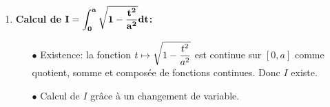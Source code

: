 \documentclass[a4paper, 11pt,reqno]{article}
\begin{document}
\begin{correction}
\begin{enumerate}
		\item \textbf{Calcul de $\mathbf{\displaystyle  I=\int_0^a \displaystyle\sqrt{1-\displaystyle\frac{t^2}{a^2}} dt}$:}
		      \begin{itemize}
			      \item[$\bullet$] Existence: la fonction $t\mapsto  \displaystyle\sqrt{1-\displaystyle\frac{t^2}{a^2}} $ est continue sur $\left\lbrack 0,a \right\rbrack$ comme quotient, somme et compos\'ee de fonctions continues. Donc $I$ existe.
			      \item[$\bullet$] Calcul de $I$ gr\^{a}ce \`{a} un changement de variable.
\end{itemize}
\end{enumerate}
\end{correction}
\end{document}
